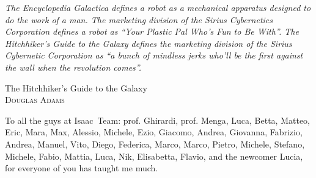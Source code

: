 \thispagestyle{empty}
\epigraph{\textit{The Encyclopedia Galactica defines a robot as a mechanical apparatus
designed to do the work of a man. The marketing division of the Sirius
Cybernetics Corporation defines a robot as ``Your Plastic Pal Who's
Fun to Be With''. The Hitchhiker's Guide to the Galaxy defines the
marketing division of the Sirius Cybernetic Corporation as ``a bunch
of mindless jerks who'll be the first against the wall when the
revolution comes''.}}{The Hitchhiker's Guide to the Galaxy\\\textsc{Douglas Adams}}
\vspace*{\fill}
To all the guys at Isaac~Team: prof. Ghirardi, prof. Menga, Luca,
Betta, Matteo, Eric, Mara, Max, Alessio, Michele,
Ezio, Giacomo, Andrea, Giovanna, Fabrizio, Andrea, Manuel, Vito, Diego,
Federica, Marco, Marco, Pietro, Michele, Stefano, Michele, Fabio, Mattia, Luca,
Nik, Elisabetta, Flavio, and the newcomer Lucia, for everyone of you
has taught me much.
\vspace*{\fill}

